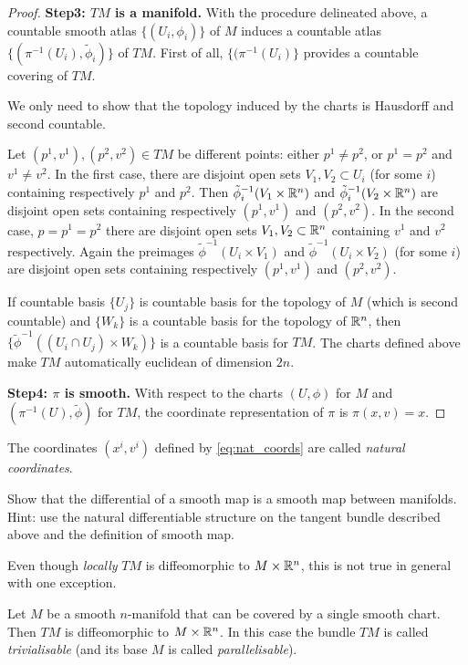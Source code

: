 \begin{proof}
    \textbf{Step3: $TM$ is a manifold.}
    With the procedure delineated above, a countable smooth atlas $\{(U_i, \phi_i)\}$ of $M$ induces a countable atlas $\{(\pi^{-1}(U_i), \tilde\phi_i)\}$ of $TM$.
    First of all, $\{(\pi^{-1}(U_i)\}$ provides a countable covering of $TM$.
    
    We only need to show that the topology induced by the charts is Hausdorff and second countable.
    
    Let $(p^1, v^1), (p^2, v^2) \in TM$ be different points: either $p^1\neq p^2$, or $p^1 = p^2$ and $v^1 \neq v^2$.
    In the first case, there are disjoint open sets $V_1, V_2 \subset U_i$ (for some $i$) containing respectively $p^1$ and $p^2$.
    Then $\tilde\phi_i^{-1}(V_1\times\mathbb{R}^n)$ and $\tilde\phi_i^{-1}(V_2\times\mathbb{R}^n)$ are disjoint open sets containing respectively $(p^1, v^1)$ and $(p^2, v^2)$.
    In the second case, $p=p^1=p^2$ there are disjoint open sets $V_1,V_2\subset \mathbb{R}^n$ containing $v^1$ and $v^2$ respectively.
    Again the preimages $\tilde\phi^{-1}(U_i\times V_1)$ and $\tilde\phi^{-1}(U_i\times V_2)$ (for some $i$) are disjoint open sets containing respectively $(p^1, v^1)$ and $(p^2, v^2)$.

    If countable basis $\{U_j\}$ is countable basis for the topology of $M$ (which is second countable) and $\{W_k\}$ is a countable basis for the topology of $\mathbb{R}^n$, then $\{\tilde\phi^{-1}((U_i\cap U_j)\times W_k)\}$ is a countable basis for $TM$.
    The charts defined above make $TM$ automatically euclidean of dimension $2n$.

    \textbf{Step4: $\pi$ is smooth.} With respect to the charts $(U,\phi)$ for $M$ and $(\pi^{-1}(U), \tilde\phi)$ for $TM$, the coordinate representation of $\pi$ is $\pi(x,v) = x$.
\end{proof}

The coordinates $(x^i, v^i)$ defined by \eqref{eq:nat_coords} are called \emph{natural coordinates}.

\begin{exe}
    Show that the differential of a smooth map is a smooth map between manifolds. Hint: use the natural differentiable structure on the tangent bundle described above and the definition of smooth map.
\end{exe}

Even though \emph{locally} $TM$ is diffeomorphic to $M\times\mathbb{R}^n$, this is not true in general with one exception.

\begin{exe}
    Let $M$ be a smooth $n$-manifold that can be covered by a single smooth chart. Then $TM$ is diffeomorphic to $M\times\mathbb{R}^n$. In this case the bundle $TM$ is called \emph{trivialisable} (and its base $M$ is called \emph{parallelisable}).
\end{exe}


